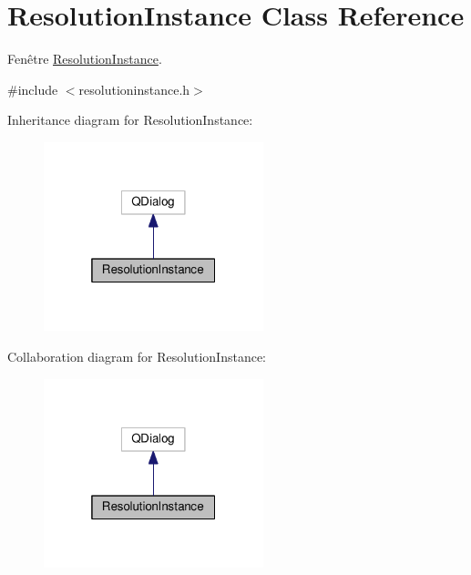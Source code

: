 \hypertarget{classResolutionInstance}{}\section{Resolution\+Instance Class Reference}
\label{classResolutionInstance}


Fenêtre \hyperlink{classResolutionInstance}{Resolution\+Instance}.  




{\ttfamily \#include $<$resolutioninstance.\+h$>$}



Inheritance diagram for Resolution\+Instance\+:\nopagebreak
\begin{figure}[H]
\begin{center}
\leavevmode
\includegraphics[width=181pt]{classResolutionInstance__inherit__graph}
\end{center}
\end{figure}


Collaboration diagram for Resolution\+Instance\+:\nopagebreak
\begin{figure}[H]
\begin{center}
\leavevmode
\includegraphics[width=181pt]{classResolutionInstance__coll__graph}
\end{center}
\end{figure}
